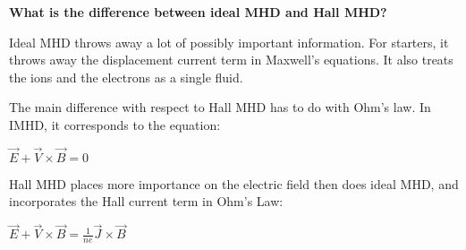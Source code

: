 \textbf{What is the difference between ideal MHD and Hall MHD?}

Ideal MHD throws away a lot of possibly important information. For
starters, it throws away the displacement current term in Maxwell's
equations. It also treats the ions and the electrons as a single
fluid. 

The main difference with respect to Hall MHD has to do with Ohm's law.
In IMHD, it corresponds to the equation:

\begin{math}
  \vec{E} + \vec{V}\times\vec{B} = 0
\end{math}

Hall MHD places more importance on the electric field then does ideal
MHD, and incorporates the Hall current term in Ohm's Law:

$ \vec{E} + \vec{V}\times\vec{B} = \frac{1}{ne}\vec{J}\times\vec{B} $
